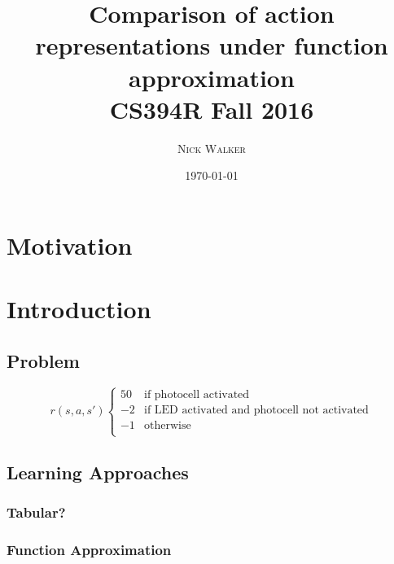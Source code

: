 \documentclass{article}
\title{Comparison of action representations under function approximation \\ \large CS394R Fall 2016} %
\author{\textsc{Nick Walker}} %
\date{\today} %
\begin{document}
	\maketitle %



	\section{Motivation}




	\section{Introduction}

	\subsection{Problem}


	\[ r(s,a,s')  \left\{
	\begin{array}{ll}
		50 & \text{if photocell activated} \\
		-2 & \text{if LED activated and photocell not activated} \\
		-1 & \text{otherwise} \\
	\end{array}
	\right. \]


	\subsection{Learning Approaches}

	\subsubsection{Tabular?}

	\subsubsection{Function Approximation}
\end{document}
